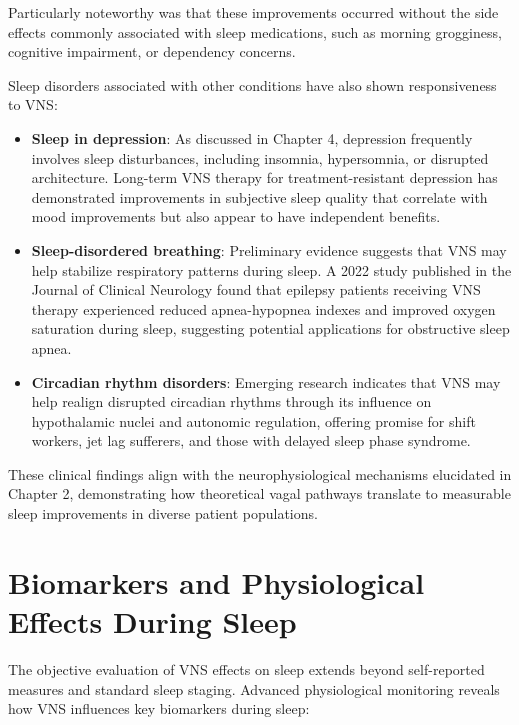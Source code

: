 \documentclass[
  Letterpaper,
]{scrbook}
\begin{document}
Particularly noteworthy was that these improvements occurred without the
side effects commonly associated with sleep medications, such as morning
grogginess, cognitive impairment, or dependency concerns.

Sleep disorders associated with other conditions have also shown
responsiveness to VNS:

\begin{itemize}
\item
  \textbf{Sleep in depression}: As discussed in Chapter 4, depression
  frequently involves sleep disturbances, including insomnia,
  hypersomnia, or disrupted architecture. Long-term VNS therapy for
  treatment-resistant depression has demonstrated improvements in
  subjective sleep quality that correlate with mood improvements but
  also appear to have independent benefits.
\item
  \textbf{Sleep-disordered breathing}: Preliminary evidence suggests
  that VNS may help stabilize respiratory patterns during sleep. A 2022
  study published in the Journal of Clinical Neurology found that
  epilepsy patients receiving VNS therapy experienced reduced
  apnea-hypopnea indexes and improved oxygen saturation during sleep,
  suggesting potential applications for obstructive sleep apnea.
\item
  \textbf{Circadian rhythm disorders}: Emerging research indicates that
  VNS may help realign disrupted circadian rhythms through its influence
  on hypothalamic nuclei and autonomic regulation, offering promise for
  shift workers, jet lag sufferers, and those with delayed sleep phase
  syndrome.
\end{itemize}

These clinical findings align with the neurophysiological mechanisms
elucidated in Chapter 2, demonstrating how theoretical vagal pathways
translate to measurable sleep improvements in diverse patient
populations.

\section{Biomarkers and Physiological Effects During
Sleep}\label{biomarkers-and-physiological-effects-during-sleep}

The objective evaluation of VNS effects on sleep extends beyond
self-reported measures and standard sleep staging. Advanced
physiological monitoring reveals how VNS influences key biomarkers
during sleep:
\end{document}
